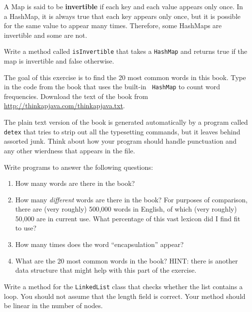 \begin{exercise}
A Map is said to be {\bf invertible} if each key and each value
appears only once.  In a HashMap, it is always true that each
key appears only once, but it is possible for the same value to
appear many times.  Therefore, some HashMaps are invertible
and some are not.

Write a method called {\tt isInvertible} that takes a {\tt HashMap}
and returns true if the map is invertible and false otherwise.
\end{exercise}


\begin{exercise}

The goal of this exercise is to find the 20 most common words in this
book.  Type in the code from the book that uses the built-in {\tt
HashMap} to count word frequencies.  Download the text of the book
from \url{http://thinkapjava.com/thinkapjava.txt}.

The plain text version of the book is generated automatically by a
program called {\tt detex} that tries to strip out all the typesetting
commands, but it leaves behind assorted junk.  Think about how your
program should handle punctuation and any other wierdness that appears
in the file.

Write programs to answer the following questions:

\begin{enumerate}

\item How many words are there in the book?

\item How many {\em different} words are there in the book?  For
purposes of comparison, there are (very roughly) 500,000 words in
English, of which (very roughly) 50,000 are in current use.  What
percentage of this vast lexicon did I find fit to use?

\item How many times does the word ``encapsulation'' appear?

\item What are the 20 most common words in the book?  HINT: there is
another data structure that might help with this part of the exercise.

\end{enumerate}
\end{exercise}


\begin{exercise}
Write a method for the {\tt LinkedList} class that checks whether
the list contains a loop.  You should not assume that the length
field is correct.
Your method should be linear in the
number of nodes.
\end{exercise}


